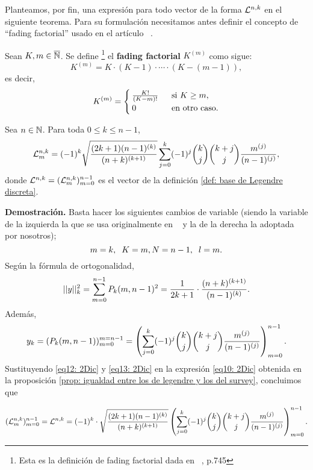 Planteamos, por fin, una expresión para
todo vector de la forma
$\mathcal{L}^{n,k}$ en el siguiente teorema.
Para su formulación necesitamos antes
definir el concepto de ``fading factorial''
usado en el artículo ~\cite{Neuman}.
\begin{defi}
\label{def: fading factorial}
Sean $K, m \in \overline{\mathbb{N}}$. Se define
\footnote{Esta es la definición de
fading factorial dada en ~\cite{Neuman}, p.745 }
el \textbf{fading factorial} $K^{(m)}$ como sigue:
\[
K^{(m)}= K \cdot (K-1) \cdot \cdots \cdot (K-(m-1)),
\]
es decir,\begin{align*}
K^{(m)}= \begin{cases}
\frac{K!}{(K-m)!} & \hspace{0.2cm} \text{si } K \geq m, \\
0 & \hspace{0.2cm} \text{en otro caso.} 
\end{cases}
\end{align*}
\end{defi}

\begin{tcolorbox}
\begin{teo}
\label{teo: expresión analítica de BON de Legendre}
Sea $n\in \mathbb{N}$. Para toda $0 \leq k \leq n-1$,
\begin{equation}
\label{eq0: 6En}
\mathcal{L}^{n,k}_{m}= (-1)^{k} \sqrt{\frac{(2k+1)(n-1)^{(k)}}{(n+k)^{(k+1)}}}
\sum\limits_{j=0}^{k}(-1)^{j}\binom{k}{j}\binom{k+j}{j}
\frac{m^{(j)}}{(n-1)^{(j)}},
\end{equation}
donde $\mathcal{L}^{n,k}=(\mathcal{L}_{m}^{n,k})_{m=0}^{n-1}$
es el vector de la definición
\ref{def: base de Legendre discreta}.
\end{teo}  
\end{tcolorbox}
\noindent
\textbf{Demostración.}
Basta hacer los siguientes cambios de variable
(siendo la variable de la izquierda la que se
usa originalmente en ~\cite{Neuman} y la de la 
derecha la adoptada por nosotros);
\[
m=k, \hspace{0.2cm} K=m,
N=n-1, \hspace{0.2cm} l=m.
\]
Según la fórmula de ortogonalidad,
\begin{equation}
\label{eq12: 2Dic}
||y||_{k}^{2}= \sum\limits_{m=0}^{n-1}P_{k}(m, n-1)^{2}
= \frac{1}{2k+1} \cdot \frac{(n+k)^{(k+1)}}{(n-1)^{(k)}}.
\end{equation}
Además, 
\begin{equation}
\label{eq13: 2Dic}
y_{k}= (P_{k}(m, n-1))_{m=0}^{m=n-1}
= \left(
\sum\limits_{j=0}^{k}(-1)^{j}\binom{k}{j}\binom{k+j}{j}
\frac{m^{(j)}}{(n-1)^{(j)}}
\right)_{m=0}^{n-1}.
\end{equation}
Sustituyendo \eqref{eq12: 2Dic}
y \eqref{eq13: 2Dic} en la expresión
\eqref{eq10: 2Dic} obtenida
en la proposición
\ref{prop: igualdad entre los de legendre y los del survey},
concluimos que

\[
(\mathcal{L}_{m}^{n,k})_{m=0}^{n-1}
= \mathcal{L}^{n,k}
= (-1)^{k} \cdot 
\sqrt{\frac{(2k+1)(n-1)^{(k)}}{(n+k)^{(k+1)}}}
\left(
\sum\limits_{j=0}^{k}(-1)^{j}\binom{k}{j}\binom{k+j}{j}
\frac{m^{(j)}}{(n-1)^{(j)}}
\right)_{m=0}^{n-1}.
\]


\QEDB 
\vspace{0.2cm}